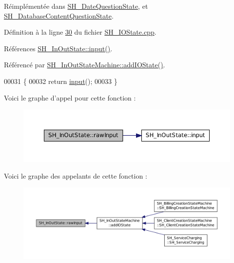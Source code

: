 Réimplémentée dans \hyperlink{classSH__DateQuestionState_ac72e5b6b416614631032ff643d3c180e}{S\-H\-\_\-\-Date\-Question\-State}, et \hyperlink{classSH__DatabaseContentQuestionState_a344d9109e15509506b1b998d28392cac}{S\-H\-\_\-\-Database\-Content\-Question\-State}.



Définition à la ligne \hyperlink{SH__IOState_8cpp_source_l00030}{30} du fichier \hyperlink{SH__IOState_8cpp_source}{S\-H\-\_\-\-I\-O\-State.\-cpp}.



Références \hyperlink{classSH__InOutState_a04364c76d2fd8a3781e7b325955e5bd9}{S\-H\-\_\-\-In\-Out\-State\-::input()}.



Référencé par \hyperlink{classSH__InOutStateMachine_ad6b778d052f741daee720c047059ce0e}{S\-H\-\_\-\-In\-Out\-State\-Machine\-::add\-I\-O\-State()}.


\begin{DoxyCode}
00031 \{
00032     \textcolor{keywordflow}{return} \hyperlink{classSH__InOutState_a04364c76d2fd8a3781e7b325955e5bd9}{input}();
00033 \}
\end{DoxyCode}


Voici le graphe d'appel pour cette fonction \-:
\nopagebreak
\begin{figure}[H]
\begin{center}
\leavevmode
\includegraphics[width=350pt]{classSH__InOutState_a4b1ca094de91c47690ec2d1e95678273_cgraph}
\end{center}
\end{figure}




Voici le graphe des appelants de cette fonction \-:
\nopagebreak
\begin{figure}[H]
\begin{center}
\leavevmode
\includegraphics[width=350pt]{classSH__InOutState_a4b1ca094de91c47690ec2d1e95678273_icgraph}
\end{center}
\end{figure}


